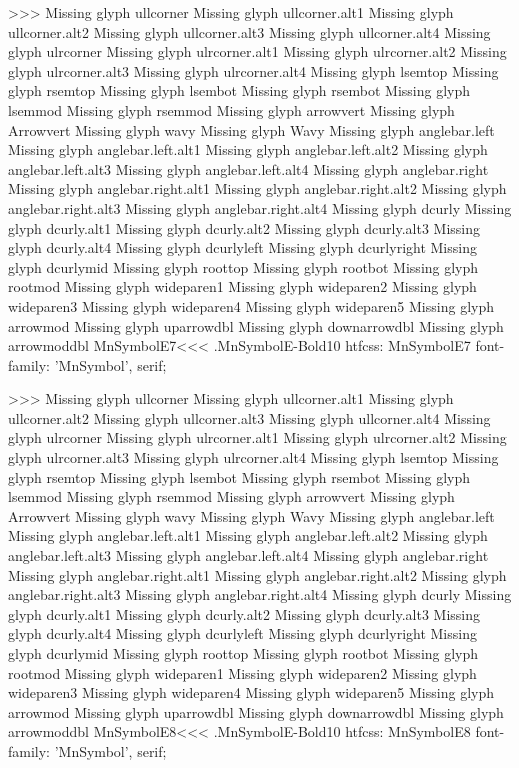 >>>
Missing glyph	ullcorner
Missing glyph	ullcorner.alt1
Missing glyph	ullcorner.alt2
Missing glyph	ullcorner.alt3
Missing glyph	ullcorner.alt4
Missing glyph	ulrcorner
Missing glyph	ulrcorner.alt1
Missing glyph	ulrcorner.alt2
Missing glyph	ulrcorner.alt3
Missing glyph	ulrcorner.alt4
Missing glyph	lsemtop
Missing glyph	rsemtop
Missing glyph	lsembot
Missing glyph	rsembot
Missing glyph	lsemmod
Missing glyph	rsemmod
Missing glyph	arrowvert
Missing glyph	Arrowvert
Missing glyph	wavy
Missing glyph	Wavy
Missing glyph	anglebar.left
Missing glyph	anglebar.left.alt1
Missing glyph	anglebar.left.alt2
Missing glyph	anglebar.left.alt3
Missing glyph	anglebar.left.alt4
Missing glyph	anglebar.right
Missing glyph	anglebar.right.alt1
Missing glyph	anglebar.right.alt2
Missing glyph	anglebar.right.alt3
Missing glyph	anglebar.right.alt4
Missing glyph	dcurly
Missing glyph	dcurly.alt1
Missing glyph	dcurly.alt2
Missing glyph	dcurly.alt3
Missing glyph	dcurly.alt4
Missing glyph	dcurlyleft
Missing glyph	dcurlyright
Missing glyph	dcurlymid
Missing glyph	roottop
Missing glyph	rootbot
Missing glyph	rootmod
Missing glyph	wideparen1
Missing glyph	wideparen2
Missing glyph	wideparen3
Missing glyph	wideparen4
Missing glyph	wideparen5
Missing glyph	arrowmod
Missing glyph	uparrowdbl
Missing glyph	downarrowdbl
Missing glyph	arrowmoddbl
\<MnSymbolE7\><<<
.MnSymbolE-Bold10
htfcss:  MnSymbolE7  font-family: 'MnSymbol', serif;

>>>
Missing glyph	ullcorner
Missing glyph	ullcorner.alt1
Missing glyph	ullcorner.alt2
Missing glyph	ullcorner.alt3
Missing glyph	ullcorner.alt4
Missing glyph	ulrcorner
Missing glyph	ulrcorner.alt1
Missing glyph	ulrcorner.alt2
Missing glyph	ulrcorner.alt3
Missing glyph	ulrcorner.alt4
Missing glyph	lsemtop
Missing glyph	rsemtop
Missing glyph	lsembot
Missing glyph	rsembot
Missing glyph	lsemmod
Missing glyph	rsemmod
Missing glyph	arrowvert
Missing glyph	Arrowvert
Missing glyph	wavy
Missing glyph	Wavy
Missing glyph	anglebar.left
Missing glyph	anglebar.left.alt1
Missing glyph	anglebar.left.alt2
Missing glyph	anglebar.left.alt3
Missing glyph	anglebar.left.alt4
Missing glyph	anglebar.right
Missing glyph	anglebar.right.alt1
Missing glyph	anglebar.right.alt2
Missing glyph	anglebar.right.alt3
Missing glyph	anglebar.right.alt4
Missing glyph	dcurly
Missing glyph	dcurly.alt1
Missing glyph	dcurly.alt2
Missing glyph	dcurly.alt3
Missing glyph	dcurly.alt4
Missing glyph	dcurlyleft
Missing glyph	dcurlyright
Missing glyph	dcurlymid
Missing glyph	roottop
Missing glyph	rootbot
Missing glyph	rootmod
Missing glyph	wideparen1
Missing glyph	wideparen2
Missing glyph	wideparen3
Missing glyph	wideparen4
Missing glyph	wideparen5
Missing glyph	arrowmod
Missing glyph	uparrowdbl
Missing glyph	downarrowdbl
Missing glyph	arrowmoddbl
\<MnSymbolE8\><<<
.MnSymbolE-Bold10
htfcss:  MnSymbolE8  font-family: 'MnSymbol', serif;

